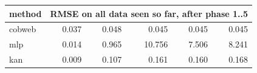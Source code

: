 \begin{tabular}{@{}lrrrrr@{}}\toprule
method & \multicolumn{5}{c}{RMSE on all data seen so far, after phase 1..5}\\\midrule
cobweb & 0.037 & 0.048 & 0.045 & 0.045 & 0.045\\
mlp & 0.014 & 0.965 & 10.756 & 7.506 & 8.241\\
kan & 0.009 & 0.107 & 0.161 & 0.160 & 0.168\\
\bottomrule\end{tabular}